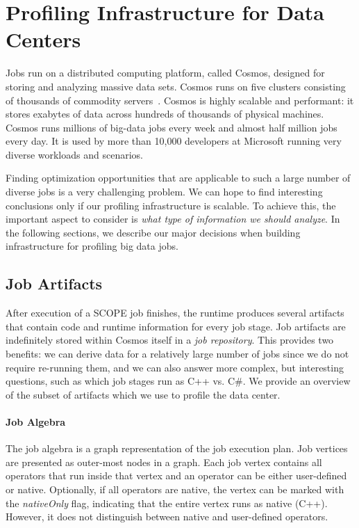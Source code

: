 \section{Profiling Infrastructure for Data Centers}
Jobs run on a distributed computing platform, called Cosmos, designed for storing and analyzing massive data sets. Cosmos runs on five clusters consisting of thousands of commodity servers~\cite{SCOPE}. Cosmos is highly scalable and performant: it stores exabytes of data across hundreds of thousands of physical machines. Cosmos runs millions of big-data jobs every week and almost half million jobs every day. It is used by more than 10,000 developers at Microsoft running very diverse workloads and scenarios.

Finding optimization opportunities that are applicable to such a large number of diverse jobs is a very challenging problem.
We can hope to find interesting conclusions only if our profiling infrastructure is scalable. To achieve this, the important aspect to consider is \emph{what type of information we should analyze}. In the following sections, we describe our major decisions when building infrastructure for profiling big data jobs.

\subsection{Job Artifacts}
\label{sec:artifacts}

After execution of a SCOPE job finishes, the runtime produces several artifacts that contain code and runtime information for every job stage.
Job artifacts are indefinitely stored within Cosmos itself in a {\em job repository}.
This provides two benefits: we can derive data for a relatively large number of jobs since we do not require re-running them, and we can also answer more complex, but interesting questions, such as which job stages run as C++ vs. C\#.
We provide an overview of the subset of artifacts which we use to profile the data center.

\paragraph{Job Algebra}

The job algebra is a graph representation of the job execution plan. Job vertices are presented as outer-most nodes in a graph. Each job vertex contains all operators that run inside that vertex and an operator can be either user-defined or native. Optionally, if all operators are native, the vertex can be marked with the \emph{nativeOnly} flag, indicating that the entire vertex runs as native (C++). However, it does not distinguish between native and user-defined operators.


